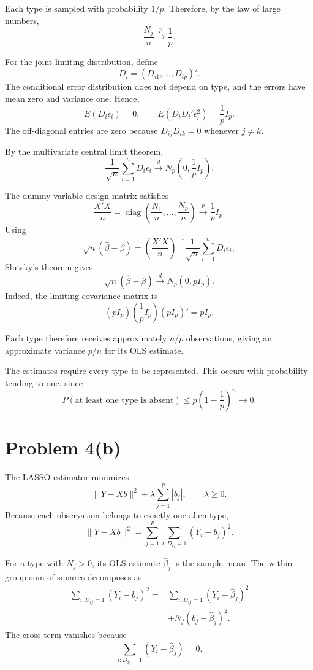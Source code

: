 \documentclass[11pt]{article}
\begin{document}
Each type is sampled with probability $1/p$.
Therefore, by the law of large numbers,
\[
\frac{N_j}{n}\xrightarrow{p}\frac{1}{p}.
\]

For the joint limiting distribution, define
\[
D_i=(D_{i1},\ldots,D_{ip})'.
\]
The conditional error distribution does not
depend on type, and the errors have mean zero
and variance one. Hence,
\[
E(D_i\epsilon_i)=0,
\qquad
E(D_iD_i'\epsilon_i^2)=\frac{1}{p}I_p.
\]
The off-diagonal entries are zero because
$D_{ij}D_{ik}=0$ whenever $j\neq k$.

By the multivariate central limit theorem,
\[
\frac{1}{\sqrt{n}}\sum_{i=1}^nD_i\epsilon_i
\xrightarrow{d}
N_p\left(0,\frac{1}{p}I_p\right).
\]

The dummy-variable design matrix satisfies
\[
\frac{X'X}{n}
=
\operatorname{diag}
\left(\frac{N_1}{n},\ldots,\frac{N_p}{n}\right)
\xrightarrow{p}\frac{1}{p}I_p.
\]
Using
\[
\sqrt{n}(\widehat{\beta}-\beta)
=
\left(\frac{X'X}{n}\right)^{-1}
\frac{1}{\sqrt{n}}\sum_{i=1}^nD_i\epsilon_i,
\]
Slutsky's theorem gives
\[
\boxed{
\sqrt{n}(\widehat{\beta}-\beta)
\xrightarrow{d}N_p(0,pI_p).
}
\]
Indeed, the limiting covariance matrix is
\[
(pI_p)\left(\frac{1}{p}I_p\right)(pI_p)'
=pI_p.
\]

Each type therefore receives approximately
$n/p$ observations, giving an approximate
variance $p/n$ for its OLS estimate.

The estimates require every type to be
represented. This occurs with probability
tending to one, since
\[
P(\text{at least one type is absent})
\leq p\left(1-\frac{1}{p}\right)^n
\longrightarrow0.
\]
\section*{Problem 4(b)}

The LASSO estimator minimizes
\[
\|Y-Xb\|^2+\lambda\sum_{j=1}^p|b_j|,
\qquad \lambda\geq0.
\]
Because each observation belongs to exactly
one alien type,
\[
\|Y-Xb\|^2
=
\sum_{j=1}^p
\sum_{i:D_{ij}=1}(Y_i-b_j)^2.
\]

For a type with $N_j>0$, its OLS estimate
$\widehat{\beta}_j$ is the sample mean.
The within-group sum of squares decomposes as
\[
\begin{aligned}
\sum_{i:D_{ij}=1}(Y_i-b_j)^2
={}&
\sum_{i:D_{ij}=1}(Y_i-\widehat{\beta}_j)^2\\
&+N_j(b_j-\widehat{\beta}_j)^2.
\end{aligned}
\]
The cross term vanishes because
\[
\sum_{i:D_{ij}=1}
(Y_i-\widehat{\beta}_j)=0.
\]
\end{document}
